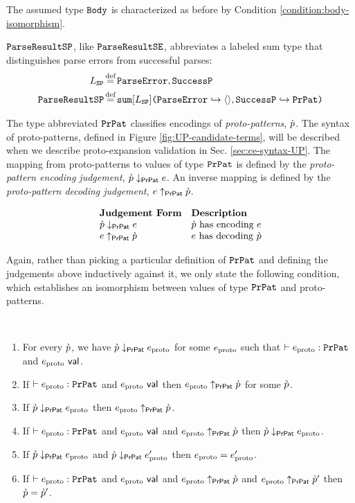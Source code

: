 {{{{\begin{enumerate}
The assumed type $\mathtt{Body}$ is characterized as before by Condition \ref{condition:body-isomorphism}.

$\mathtt{ParseResultSP}$, like $\mathtt{ParseResultSE}$, abbreviates a labeled sum type that distinguishes parse errors from successful parses:
\begin{align*}
L_\mathtt{SP} & \defeq \lbltxt{ParseError}, \lbltxt{SuccessP}\\
\tParseResultPat & \defeq \asum{L_\mathtt{SP}}{
  \mapitem{\lbltxt{ParseError}}{\prodt{}}, 
  \mapitem{\lbltxt{SuccessP}}{\tCEPat}
}
\end{align*} %

The type abbreviated $\mathtt{PrPat}$ classifies encodings of \emph{proto-patterns}, $\grave{p}$. The syntax of proto-patterns, defined in Figure \ref{fig:UP-candidate-terms}, will be described when we describe proto-expansion validation in Sec. \ref{sec:ce-syntax-UP}. The mapping from proto-patterns to values of type $\mathtt{PrPat}$ is defined by the \emph{proto-pattern encoding judgement}, $\grave{p} \downarrow_\mathsf{PrPat} e$. An inverse mapping is defined by the \emph{proto-pattern decoding judgement}, $e \uparrow_\mathsf{PrPat} \grave{p}$.

\[\begin{array}{ll}
\textbf{Judgement Form} & \textbf{Description}\\
\grave{p} \downarrow_\mathsf{PrPat} e & \text{$\grave{p}$ has encoding $e$}\\
e \uparrow_\mathsf{PrPat} \grave{p} & \text{$e$ has decoding $\grave{p}$}
\end{array}\]

Again, rather than picking a particular definition of $\mathtt{PrPat}$ and defining the judgements above inductively against it, we only state the following condition, which establishes an isomorphism between values of type $\mathtt{PrPat}$ and proto-patterns.

\begingroup
\def\thetheorem{\ref{condition:proto-pattern-isomorphism}}
\begin{condition} ~
\begin{enumerate}
\item For every $\grave{p}$, we have $\grave{p} \downarrow_\mathsf{PrPat} e_\text{proto}$ for some $e_\text{proto}$ such that $\vdash e_\text{proto} : \mathtt{PrPat}$ and $e_\text{proto}~\mathsf{val}$.
\item If $\vdash e_\text{proto} : \mathtt{PrPat}$ and $e_\text{proto}~\mathsf{val}$ then $e_\text{proto} \uparrow_\mathsf{PrPat} \grave{p}$ for some $\grave{p}$.
\item If $\grave{p} \downarrow_\mathsf{PrPat} e_\text{proto}$ then $e_\text{proto} \uparrow_\mathsf{PrPat} \grave{p}$.
\item If $\vdash e_\text{proto} : \mathtt{PrPat}$ and $e_\text{proto}~\mathsf{val}$ and $e_\text{proto} \uparrow_\mathsf{PrPat} \grave{p}$ then $\grave{p} \downarrow_\mathsf{PrPat} e_\text{proto}$.
\item If $\grave{p} \downarrow_\mathsf{PrPat} e_\text{proto}$ and $\grave{p} \downarrow_\mathsf{PrPat} e_\text{proto}'$ then $e_\text{proto}=e_\text{proto}'$.
\item If $\vdash e_\text{proto} : \mathtt{PrPat}$ and $e_\text{proto}~\mathsf{val}$ and $e_\text{proto} \uparrow_\mathsf{PrPat} \grave{p}$ and $e_\text{proto} \uparrow_\mathsf{PrPat} \grave{p}'$ then $\grave{p}=\grave{p}'$.
\end{enumerate}
\end{condition}
\endgroup


\end{enumerate}}}}}
